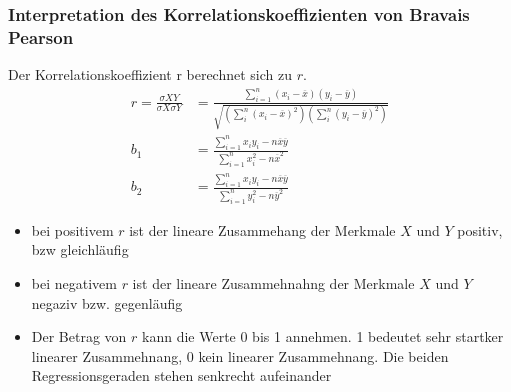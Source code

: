 \subsubsection{Interpretation des Korrelationskoeffizienten von Bravais Pearson}
Der Korrelationskoeffizient r berechnet sich zu $r$.
\begin{align}
r=\frac{\sigma XY}{\sigma X \sigma Y} &= \frac{\sum_{i=1}^n\left(x_i-\overline{x} \right )\left(y_i - \overline{y} \right )}{\sqrt{\left(\sum_i^n\left(x_i - \overline{x}\right)^2 \right )\left(\sum_i^n\left(y_i - \overline{y} \right )^2 \right )}}\\
b_1 &=\frac{\sum_{i=1}^n x_i y_i - n\overline{x}\overline{y}}{\sum_{i=1}^n x_i^2 - n\overline{x}^2}\\
b_2 &= \frac{\sum_{i=1}^n x_i y_i - n\overline{x}\overline{y}}{\sum_{i=1}^n y_i^2 - n\overline{y}^2}
\end{align}
\begin{itemize}
\item bei positivem $r$ ist der lineare Zusammehang der Merkmale $X$ und $Y$ positiv, bzw gleichläufig
\item bei negativem $r$ ist der lineare Zusammehnahng der Merkmale $X$ und $Y$ negaziv bzw. gegenläufig
\item Der Betrag von $r$ kann die Werte 0 bis 1 annehmen. 1 bedeutet sehr startker linearer Zusammehnang, 0 kein linearer Zusammehnang. Die beiden Regressionsgeraden stehen senkrecht aufeinander
\end{itemize}
